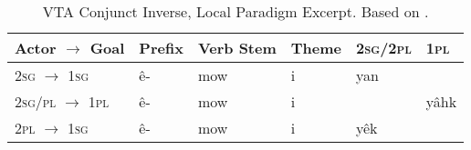 \begin{table}
\centering
\begin{tabular}{llllll}
    \toprule
Actor $\rightarrow$   Goal                                                                               & Prefix & Verb Stem & Theme & 2\textsc{sg}/2\textsc{pl} & 1\textsc{pl} \\    
\midrule
2\textsc{sg} $\rightarrow$   1\textsc{sg}             & ê-     &    mow       & i     & yan                                                         &                               \\
2\textsc{sg}/\textsc{pl} $\rightarrow$   1\textsc{pl} & ê-     &    mow       & i     &                                                             & yâhk                          \\
2\textsc{pl} $\rightarrow$   1\textsc{sg}             & ê-     &    mow       & i     & yêk                                                         &                               \\
    \bottomrule
  \end{tabular}
  \caption{
    VTA Conjunct Inverse, Local Paradigm Excerpt. Based on \citet[419]{Wolvengrey2011}. \label{tab:vtacnjinvlocal}
  }
\end{table}


